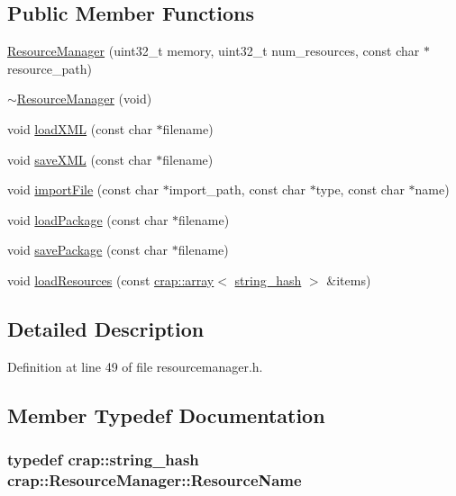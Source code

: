 \subsection*{Public Member Functions}
\begin{DoxyCompactItemize}
\item 
\hyperlink{classcrap_1_1_resource_manager_a7a3ae9eaae850f6bbf3a820089bbbd9a}{Resource\+Manager} (uint32\+\_\+t memory, uint32\+\_\+t num\+\_\+resources, const char $\ast$resource\+\_\+path)
\item 
\hyperlink{classcrap_1_1_resource_manager_a3767e6beaffac75e340a728fab19ce34}{$\sim$\+Resource\+Manager} (void)
\item 
void \hyperlink{classcrap_1_1_resource_manager_ab56cdf951b9653475d02817bf2016ec6}{load\+X\+M\+L} (const char $\ast$filename)
\item 
void \hyperlink{classcrap_1_1_resource_manager_a9c3faa7caa517c5b427fe741cddc0228}{save\+X\+M\+L} (const char $\ast$filename)
\item 
void \hyperlink{classcrap_1_1_resource_manager_a5ecd8f1ec2e4e500388c72143814b1d6}{import\+File} (const char $\ast$import\+\_\+path, const char $\ast$type, const char $\ast$name)
\item 
void \hyperlink{classcrap_1_1_resource_manager_a67b9a7a308a8799f6f7e84c94dd52192}{load\+Package} (const char $\ast$filename)
\item 
void \hyperlink{classcrap_1_1_resource_manager_aa8d0f05c19bb1835e16bbb5ed4f6804d}{save\+Package} (const char $\ast$filename)
\item 
void \hyperlink{classcrap_1_1_resource_manager_a6f8ed4c5e4d604c814162b44914555d2}{load\+Resources} (const \hyperlink{classcrap_1_1array}{crap\+::array}$<$ \hyperlink{classcrap_1_1string__hash}{string\+\_\+hash} $>$ \&items)
\end{DoxyCompactItemize}


\subsection{Detailed Description}


Definition at line 49 of file resourcemanager.\+h.



\subsection{Member Typedef Documentation}
\hypertarget{classcrap_1_1_resource_manager_a1aa9ba8213544040ec264aa4b1651f78}{
\subsubsection[{Resource\+Name}]{\setlength{\rightskip}{0pt plus 5cm}typedef {\bf crap\+::string\+\_\+hash} {\bf crap\+::\+Resource\+Manager\+::\+Resource\+Name}}}\label{classcrap_1_1_resource_manager_a1aa9ba8213544040ec264aa4b1651f78}


